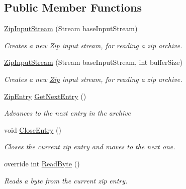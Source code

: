 \subsection*{Public Member Functions}
\begin{DoxyCompactItemize}
\item 
\hyperlink{class_i_c_sharp_code_1_1_sharp_zip_lib_1_1_zip_1_1_zip_input_stream_a453c9cf3787f5fa5210c415e3f1d8ae4}{Zip\+Input\+Stream} (Stream base\+Input\+Stream)
\begin{DoxyCompactList}\small\item\em Creates a new \hyperlink{namespace_i_c_sharp_code_1_1_sharp_zip_lib_1_1_zip}{Zip} input stream, for reading a zip archive. \end{DoxyCompactList}\item 
\hyperlink{class_i_c_sharp_code_1_1_sharp_zip_lib_1_1_zip_1_1_zip_input_stream_a8c1051f3e713730e937f742264262b24}{Zip\+Input\+Stream} (Stream base\+Input\+Stream, int buffer\+Size)
\begin{DoxyCompactList}\small\item\em Creates a new \hyperlink{namespace_i_c_sharp_code_1_1_sharp_zip_lib_1_1_zip}{Zip} input stream, for reading a zip archive. \end{DoxyCompactList}\item 
\hyperlink{class_i_c_sharp_code_1_1_sharp_zip_lib_1_1_zip_1_1_zip_entry}{Zip\+Entry} \hyperlink{class_i_c_sharp_code_1_1_sharp_zip_lib_1_1_zip_1_1_zip_input_stream_a800051faf6c618dd96027a5650aef46f}{Get\+Next\+Entry} ()
\begin{DoxyCompactList}\small\item\em Advances to the next entry in the archive \end{DoxyCompactList}\item 
void \hyperlink{class_i_c_sharp_code_1_1_sharp_zip_lib_1_1_zip_1_1_zip_input_stream_a4f57fd826e3723f23998b1a2769fa712}{Close\+Entry} ()
\begin{DoxyCompactList}\small\item\em Closes the current zip entry and moves to the next one. \end{DoxyCompactList}\item 
override int \hyperlink{class_i_c_sharp_code_1_1_sharp_zip_lib_1_1_zip_1_1_zip_input_stream_aff6a0f10f3aa6616490ad0b772ba81ae}{Read\+Byte} ()
\begin{DoxyCompactList}\small\item\em Reads a byte from the current zip entry. \end{DoxyCompactList}\item 

\end{DoxyCompactItemize}
